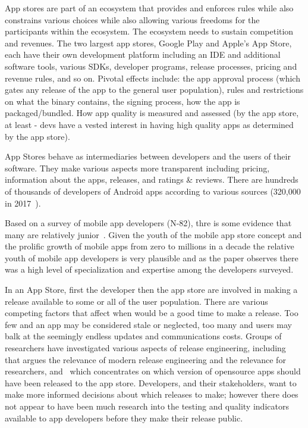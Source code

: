App stores are part of an ecosystem that provides and enforces rules while also constrains various choices while also allowing various freedoms for the participants within the ecosystem. The ecosystem needs to sustain competition~ and revenues. The two largest app stores, Google Play and Apple's App Store, each have their own development platform including an IDE and additional software tools, various SDKs, developer programs, release processes, pricing and revenue rules, and so on. 
Pivotal effects include: the app approval process (which gates any release of the app to the general user population), rules and restrictions on what the binary contains, the signing process, how the app is packaged/bundled. How app quality is measured and assessed (by the app store, at least - devs have a vested interest in having high quality apps as determined by the app store).

App Stores behave as intermediaries between developers and the users of their software. They make various aspects more transparent including pricing, information about the apps, releases, and ratings \& reviews. There are hundreds of thousands of developers of Android apps according to various sources (320,000 in 2017~\cite{wang2017_exploratory_study_of_the_mobile_app_ecosystem}). 

Based on a survey of mobile app developers (N-82), thre is some evidence that many are relatively junior~\cite[p. 142 and p.134]{francese2017_mobile_app_development_and_management_results_from_a_quantitative_investigation}. Given the youth of the mobile app store concept and the prolific growth of mobile apps from zero to millions in a decade the relative youth of mobile app developers is very plausible and as the paper observes there was a high level of specialization and expertise among the developers surveyed.

In an App Store, first the developer then the app store are involved in making a release available to some or all of the user population. There are various competing factors that affect when would be a good time to make a release. Too few and an app may be considered stale or neglected, too many and users may balk at the seemingly endless updates and communications costs. Groups of researchers have investigated various aspects of release engineering, including~ that argues the relevance of modern release engineering and the relevance for researchers, and~ which concentrates on which version of opensource apps should have been released to the app store. Developers, and their stakeholders, want to make more informed decisions about which releases to make; however there does not appear to have been much research into the testing and quality indicators available to app developers before they make their release public.


